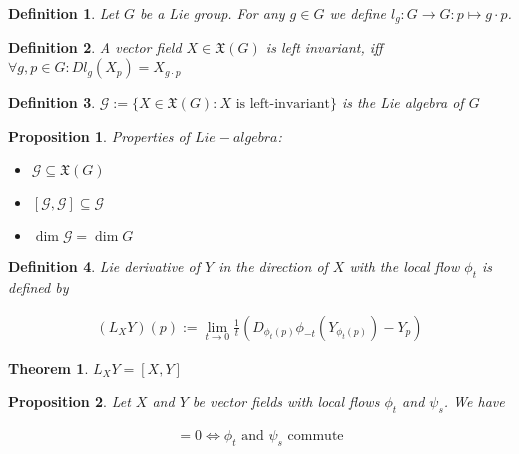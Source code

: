 \documentclass{scrartcl}
\newtheorem*{mydef}{Definition}
\newtheorem*{prop}{Proposition}
\newtheorem*{thm}{Theorem}
\begin{document}
\begin{mydef}
  Let $G$ be a Lie group. For any $g\in G$ we define $l_g:G\rightarrow G: p \mapsto g\cdot p$.
\end{mydef}

\begin{mydef}
  A vector field $X\in \mathfrak X(G)$ is left invariant, iff $\forall g,p\in G: D l_g(X_p) = X_{g\cdot p}$
\end{mydef}

\begin{mydef}
  $\mathcal G := \{ X\in \mathfrak X(G): X \text{ is left-invariant}\}$ is the \emph{Lie algebra of $G$}
\end{mydef}

\begin{prop}
  Properties of $Lie-algebra$:

  \begin{itemize}
  \item $\mathcal G \subseteq \mathfrak X(G)$
  \item $[\mathcal G,\mathcal G] \subseteq \mathcal G$
  \item $\operatorname{dim} \mathcal G = \operatorname{dim} G$
  \end{itemize}
\end{prop}

\begin{mydef}
  \emph{Lie derivative} of $Y$ in the direction of $X$ with the local flow $\phi_t$ is defined by

  \begin{align}
    (L_X Y)(p) := \lim_{t\rightarrow0} \tfrac 1t (D_{\phi_t(p)}\phi_{-t}(Y_{\phi_t(p)})-Y_p)
  \end{align}
\end{mydef}

\begin{thm}
  $L_X Y = [X,Y]$
\end{thm}

\begin{prop}
  Let $X$ and $Y$ be vector fields with local flows $\phi_t$ and $\psi_s$. We have

  \begin{align}
    [X,Y]=0 \Leftrightarrow \phi_t \text{ and } \psi_s \text{ commute}
  \end{align}
\end{prop}
\end{document}

